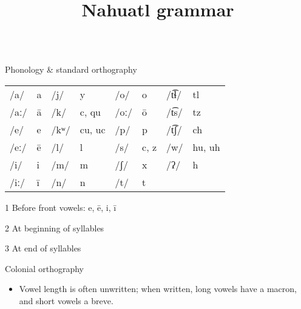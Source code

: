 \documentclass[12pt]{beamer}
\title{Nahuatl grammar}
\newcommand{\nah}[1]{\textcolor{nahgrn}{#1}}
\begin{document}
\begin{frame}%
  \begin{columns}[t]
    \begin{column}{.22\linewidth}
      \begin{block}{Phonology \& standard orthography}
        \begin{threeparttable}
          \begin{tabular}{l@{\,}l@{\qquad}l@{\,}l@{\qquad}l@{\,}l@{\qquad}l@{\,}l}
            /a/  & \nah{a} & /j/  & \nah{y}                              & /o/  & \nah{o}                   & /t͡ɬ/ & \nah{tl}                             \\
            /aː/ & \nah{ā} & /k/  & \nah{c}, \nah{qu}\tnote{1}           & /oː/ & \nah{ō}                   & /t͡s/ & \nah{tz}                             \\
            /e/  & \nah{e} & /kʷ/ & \nah{cu}\tnote{2}, \nah{uc}\tnote{3} & /p/  & \nah{p}                   & /t͡ʃ/ & \nah{ch}                             \\
            /eː/ & \nah{ē} & /l/  & \nah{l}                              & /s/  & \nah{c}\tnote{1}, \nah{z} & /w/  & \nah{hu}\tnote{2}, \nah{uh}\tnote{3} \\
            /i/  & \nah{i} & /m/  & \nah{m}                              & /ʃ/  & \nah{x}                   & /ʔ/  & \nah{h}                              \\
            /iː/ & \nah{ī} & /n/  & \nah{n}                              & /t/  & \nah{t}                   &      &
          \end{tabular}
          \begin{tablenotes}
            \item[1] Before front vowels: \nah{e, ē, i, ī}
            \item[2] At beginning of syllables
            \item[3] At end of syllables
          \end{tablenotes}
        \end{threeparttable}
      \end{block}
      \begin{block}{Colonial orthography}
        \begin{itemize}
          \item Vowel length is often unwritten; when written, long vowels have a macron, and short vowels a breve.
                \begin{itemize}

\end{itemize}
\end{itemize}
\end{block}
\end{column}
\end{columns}
\end{frame}
\end{document}
